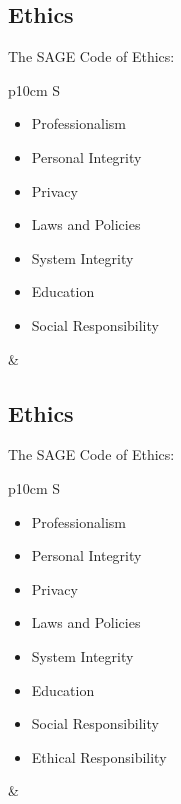 \documentclass[xga]{xdvislides}
\begin{document}
\subsection{Ethics}
The SAGE Code of Ethics:
\\

\begin{tabular}{ p{10cm} S }
\begin{itemize}
	\item Professionalism
	\item Personal Integrity
	\item Privacy
	\item Laws and Policies
	\item System Integrity
	\item Education
	\item Social Responsibility
\end{itemize}
&  \\
\end{tabular}


\subsection{Ethics}
The SAGE Code of Ethics:
\\

\begin{tabular}{ p{10cm} S }
\begin{itemize}
	\item Professionalism
	\item Personal Integrity
	\item Privacy
	\item Laws and Policies
	\item System Integrity
	\item Education
	\item Social Responsibility
	\item Ethical Responsibility
\end{itemize}
&  \\
\end{tabular}
\end{document}
